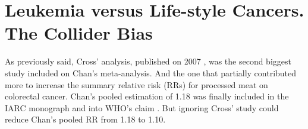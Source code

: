 \documentclass{article}
\begin{document}












\section{Leukemia versus Life-style Cancers. The Collider Bias}
\label{sec:cross}
As previously said, Cross' analysis, published on 2007 \cite{cross}, was the second biggest study included on Chan's meta-analysis. And the one that partially contributed more to increase the summary relative risk (RRs) for processed meat on colorectal cancer. Chan's pooled estimation of 1.18 was finally included in the IARC monograph \cite{monograph} and into WHO's claim \cite{whoint}. But ignoring Cross' study could reduce Chan's pooled RR from 1.18 to 1.10.
\end{document}

